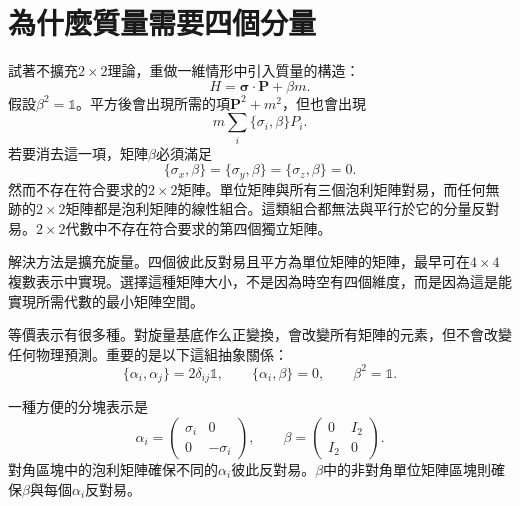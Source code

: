 \section{為什麼質量需要四個分量}

試著不擴充\(2\times2\)理論，重做一維情形中引入質量的構造：
\begin{equation}
H=\boldsymbol{\sigma}\cdot\mathbf P+\beta m.
\label{eq:l10-failed-mass}
\end{equation}
假設\(\beta^2=\mathbb{1}\)。平方後會出現所需的項\(\mathbf P^2+m^2\)，但也會出現
\begin{equation}
m\sum_i\{\sigma_i,\beta\}P_i.
\end{equation}
若要消去這一項，矩陣\(\beta\)必須滿足
\begin{equation}
\{\sigma_x,\beta\}
=
\{\sigma_y,\beta\}
=
\{\sigma_z,\beta\}
=0.
\label{eq:l10-impossible-beta}
\end{equation}
然而不存在符合要求的\(2\times2\)矩陣。單位矩陣與所有三個泡利矩陣對易，而任何無跡的\(2\times2\)矩陣都是泡利矩陣的線性組合。這類組合都無法與平行於它的分量反對易。\(2\times2\)代數中不存在符合要求的第四個獨立矩陣。

解決方法是擴充旋量。四個彼此反對易且平方為單位矩陣的矩陣，最早可在\(4\times4\)複數表示中實現。選擇這種矩陣大小，不是因為時空有四個維度，而是因為這是能實現所需代數的最小矩陣空間。

等價表示有很多種。對旋量基底作么正變換，會改變所有矩陣的元素，但不會改變任何物理預測。重要的是以下這組抽象關係：
\begin{equation}
\{\alpha_i,\alpha_j\}=2\delta_{ij}\mathbb{1},
\qquad
\{\alpha_i,\beta\}=0,
\qquad
\beta^2=\mathbb{1}.
\label{eq:l10-dirac-algebra}
\end{equation}

\begin{classroomqa}
\end{classroomqa}

一種方便的分塊表示是
\begin{equation}
\alpha_i=
\begin{pmatrix}
\sigma_i&0\\
0&-\sigma_i
\end{pmatrix},
\qquad
\beta=
\begin{pmatrix}
0&I_2\\
I_2&0
\end{pmatrix}.
\label{eq:l10-block-representation}
\end{equation}
對角區塊中的泡利矩陣確保不同的\(\alpha_i\)彼此反對易。\(\beta\)中的非對角單位矩陣區塊則確保\(\beta\)與每個\(\alpha_i\)反對易。

